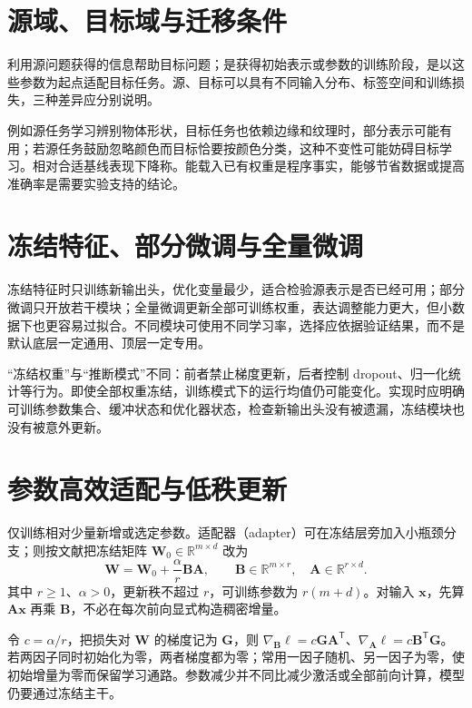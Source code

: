 \documentclass[UTF8,12pt,a4paper,fontset=fandol]{ctexbook}
\begin{document}
\section{源域、目标域与迁移条件}
利用源问题获得的信息帮助目标问题；是获得初始表示或参数的训练阶段，是以这些参数为起点适配目标任务。源、目标可以具有不同输入分布、标签空间和训练损失，三种差异应分别说明。

例如源任务学习辨别物体形状，目标任务也依赖边缘和纹理时，部分表示可能有用；若源任务鼓励忽略颜色而目标恰要按颜色分类，这种不变性可能妨碍目标学习。相对合适基线表现下降称。能载入已有权重是程序事实，能够节省数据或提高准确率是需要实验支持的结论。

\section{冻结特征、部分微调与全量微调}
冻结特征时只训练新输出头，优化变量最少，适合检验源表示是否已经可用；部分微调只开放若干模块；全量微调更新全部可训练权重，表达调整能力更大，但小数据下也更容易过拟合。不同模块可使用不同学习率，选择应依据验证结果，而不是默认底层一定通用、顶层一定专用。

“冻结权重”与“推断模式”不同：前者禁止梯度更新，后者控制 dropout、归一化统计等行为。即使全部权重冻结，训练模式下的运行均值仍可能变化。实现时应明确可训练参数集合、缓冲状态和优化器状态，检查新输出头没有被遗漏，冻结模块也没有被意外更新。

\section{参数高效适配与低秩更新}
仅训练相对少量新增或选定参数。适配器（adapter）可在冻结层旁加入小瓶颈分支；则按文献\cite{hu2021}把冻结矩阵 $\mathbf W_0\in\mathbb R^{m\times d}$ 改为
\begin{equation}
\mathbf W=\mathbf W_0+\frac\alpha r\mathbf B\mathbf A,
\qquad \mathbf B\in\mathbb R^{m\times r},\quad\mathbf A\in\mathbb R^{r\times d}.
\label{eq:dl-low-rank}
\end{equation}
其中 $r\geq1$、$\alpha>0$，更新秩不超过 $r$，可训练参数为 $r(m+d)$。对输入 $\mathbf x$，先算 $\mathbf A\mathbf x$ 再乘 $\mathbf B$，不必在每次前向显式构造稠密增量。

令 $c=\alpha/r$，把损失对 $\mathbf W$ 的梯度记为 $\mathbf G$，则 $\nabla_{\mathbf B}\ell=c\mathbf G\mathbf A^\mathsf T$、$\nabla_{\mathbf A}\ell=c\mathbf B^\mathsf T\mathbf G$。若两因子同时初始化为零，两者梯度都为零；常用一因子随机、另一因子为零，使初始增量为零而保留学习通路。参数减少并不同比减少激活或全部前向计算，模型仍要通过冻结主干。
\end{document}
